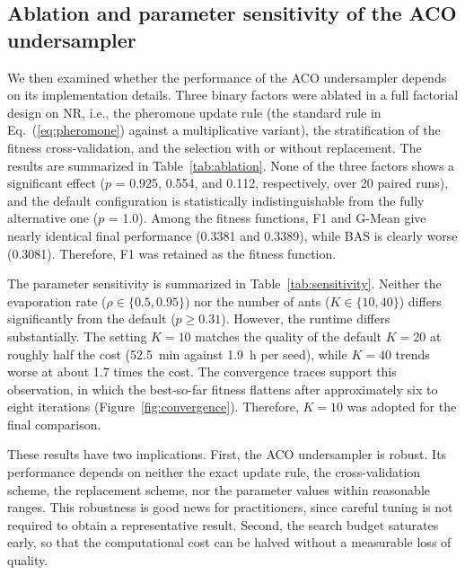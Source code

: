 \documentclass[pdflatex,sn-basic]{sn-jnl}
\begin{document}
\subsection{Ablation and parameter sensitivity of the ACO undersampler}
\label{sec:ablation}
We then examined whether the performance of the ACO undersampler depends
on its implementation details. Three binary factors were ablated in a
full factorial design on NR, i.e., the pheromone update rule (the
standard rule in Eq.~(\ref{eq:pheromone}) against a multiplicative
variant), the stratification of the fitness cross-validation, and the
selection with or without replacement. The results are summarized in
Table~\ref{tab:ablation}. None of the three factors shows a significant
effect ($p$ = 0.925, 0.554, and 0.112, respectively, over 20 paired
runs), and the default configuration is statistically indistinguishable
from the fully alternative one ($p$ = 1.0). Among the fitness functions,
F1 and G-Mean give nearly identical final performance (0.3381 and
0.3389), while BAS is clearly worse (0.3081). Therefore, F1 was retained
as the fitness function.

The parameter sensitivity is summarized in Table~\ref{tab:sensitivity}.
Neither the evaporation rate ($\rho \in \{0.5, 0.95\}$) nor the
number of ants ($K \in \{10, 40\}$) differs significantly from the
default ($p \geq 0.31$). However, the runtime differs substantially. The setting $K = 10$
matches the quality of the default $K = 20$ at roughly half the cost
(52.5~min against 1.9~h per seed), while $K = 40$ trends worse at about 1.7 times the cost. The convergence traces support this observation, in
which the best-so-far fitness flattens after approximately six to eight
iterations (Figure~\ref{fig:convergence}). Therefore, $K = 10$ was
adopted for the final comparison.

These results have two implications. First, the ACO undersampler is
robust. Its performance depends on neither the exact update rule, the
cross-validation scheme, the replacement scheme, nor the parameter
values within reasonable ranges. This robustness is good news for
practitioners, since careful tuning is not required to obtain a
representative result. Second, the search budget saturates early, so
that the computational cost can be halved without a measurable loss of
quality.
\end{document}

